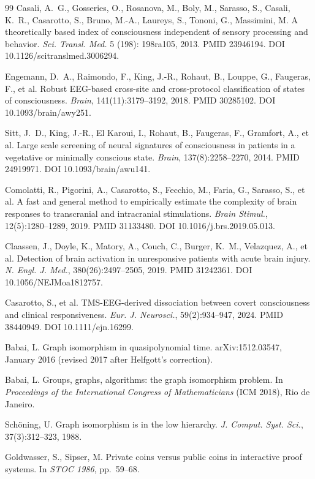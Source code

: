 \documentclass[11pt,a4paper]{amsart}
\theoremstyle{plain}
\theoremstyle{definition}
\begin{document}
\begin{thebibliography}{99}
Casali, A.~G., Gosseries, O., Rosanova, M., Boly, M., Sarasso, S., Casali, K.~R., Casarotto, S., Bruno, M.-A., Laureys, S., Tononi, G., Massimini, M.
\newblock A theoretically based index of consciousness independent of sensory processing and behavior.
\newblock \emph{Sci. Transl. Med.} 5 (198): 198ra105, 2013. PMID 23946194. DOI 10.1126/scitranslmed.3006294.

Engemann, D.~A., Raimondo, F., King, J.-R., Rohaut, B., Louppe, G., Faugeras, F., et al.
\newblock Robust EEG-based cross-site and cross-protocol classification of states of consciousness.
\newblock \emph{Brain}, 141(11):3179--3192, 2018. PMID 30285102. DOI 10.1093/brain/awy251.

Sitt, J.~D., King, J.-R., El Karoui, I., Rohaut, B., Faugeras, F., Gramfort, A., et al.
\newblock Large scale screening of neural signatures of consciousness in patients in a vegetative or minimally conscious state.
\newblock \emph{Brain}, 137(8):2258--2270, 2014. PMID 24919971. DOI 10.1093/brain/awu141.

Comolatti, R., Pigorini, A., Casarotto, S., Fecchio, M., Faria, G., Sarasso, S., et al.
\newblock A fast and general method to empirically estimate the complexity of brain responses to transcranial and intracranial stimulations.
\newblock \emph{Brain Stimul.}, 12(5):1280--1289, 2019. PMID 31133480. DOI 10.1016/j.brs.2019.05.013.

Claassen, J., Doyle, K., Matory, A., Couch, C., Burger, K.~M., Velazquez, A., et al.
\newblock Detection of brain activation in unresponsive patients with acute brain injury.
\newblock \emph{N. Engl. J. Med.}, 380(26):2497--2505, 2019. PMID 31242361. DOI 10.1056/NEJMoa1812757.

Casarotto, S., et al.
\newblock TMS-EEG-derived dissociation between covert consciousness and clinical responsiveness.
\newblock \emph{Eur. J. Neurosci.}, 59(2):934--947, 2024. PMID 38440949. DOI 10.1111/ejn.16299.

Babai, L.
\newblock Graph isomorphism in quasipolynomial time.
\newblock arXiv:1512.03547, January 2016 (revised 2017 after Helfgott's correction).

Babai, L.
\newblock Groups, graphs, algorithms: the graph isomorphism problem.
\newblock In \emph{Proceedings of the International Congress of Mathematicians} (ICM 2018), Rio de Janeiro.

Sch\"oning, U.
\newblock Graph isomorphism is in the low hierarchy.
\newblock \emph{J. Comput. Syst. Sci.}, 37(3):312--323, 1988.

Goldwasser, S., Sipser, M.
\newblock Private coins versus public coins in interactive proof systems.
\newblock In \emph{STOC 1986}, pp.~59--68.

\end{thebibliography}
\end{document}

